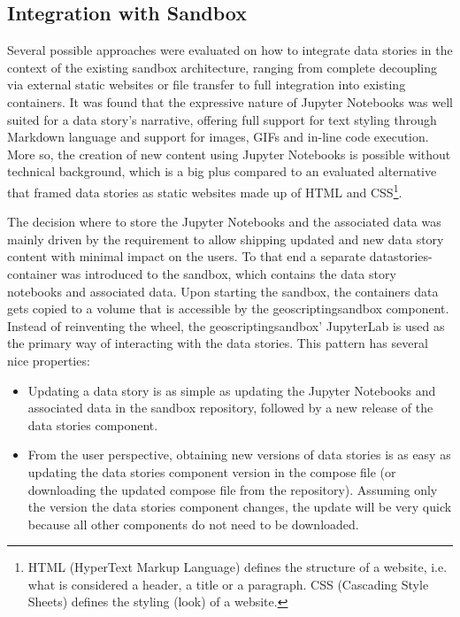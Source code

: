 \documentclass[11pt, a4paper, oneside, parskip=full-]{scrartcl}
\begin{document}
\subsection{Integration with Sandbox}
Several possible approaches were evaluated on how to integrate data stories in
the context of the existing sandbox architecture, ranging from complete
decoupling via external static websites or file transfer to full integration
into existing containers. It was found that the expressive nature of Jupyter
Notebooks was well suited for a data story's narrative, offering full support
for text styling through Markdown language and support for images, GIFs and
in-line code execution. More so, the creation of new content using Jupyter
Notebooks is possible without technical background, which is a big plus compared
to an evaluated alternative that framed data stories as static websites made up
of HTML and CSS\footnote{HTML (HyperText Markup Language) defines the structure
of a website, i.e. what is considered a header, a title or a paragraph. CSS
(Cascading Style Sheets) defines the styling (look) of a website.}.

The decision where to store the Jupyter Notebooks and the associated data was
mainly driven by the requirement to allow shipping updated and new data story
content with minimal impact on the users. To that end a separate
datastories-container was introduced to the sandbox, which contains the data
story notebooks and associated data. Upon starting the sandbox, the containers
data gets copied to a volume that is accessible by the geoscriptingsandbox
component. Instead of reinventing the wheel, the geoscriptingsandbox' JupyterLab
is used as the primary way of interacting with the data stories. This pattern
has several nice properties:
\begin{itemize}
  \item Updating a data story is as simple as updating the Jupyter Notebooks and
  associated data in the sandbox repository, followed by a new release of the
  data stories component.
  \item From the user perspective, obtaining new versions of data stories is as
  easy as updating the data stories component version in the compose file (or
  downloading the updated compose file from the repository). Assuming only the
  version the data stories component changes, the update will be very quick
  because all other components do not need to be downloaded.
\end{itemize}
\end{document}
